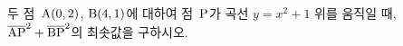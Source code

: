 두 점~$\mathrm{A}(0{,}\mkern3mu\mathopen{}2)$, $\mathrm{B}(4{,}\mkern3mu\mathopen{}1)$에 대하여 점~$\mathrm{P}$가 곡선 $y=x^2+1$ 위를 움직일 때, $\overline{\mathrm{AP}}^2+\overline{\mathrm{BP}}^2$의 최솟값을 구하시오.
